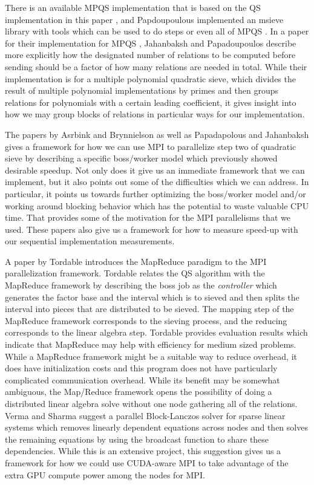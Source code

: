 \documentclass[11pt,twocolumn]{article}
\begin{document}
\indent There is an available MPQS implementation that is based on the QS implementation in this paper \cite{bytopia:help}, and Papdoupoulous implemented an msieve library with tools which can be used to do steps or even all of MPQS \cite{papadopoulos:msieve}. In a paper for their implementation for MPQS \cite{jahenbaksh:mpiQS}, Jahanbaksh and Papadoupoulos describe more explicitly how the designated number of relations to be computed before sending should be a factor of how many relations are needed in total. While their implementation is for a multiple polynomial quadratic sieve, which divides the result of multiple polynomial implementations by primes and then groups relations for polynomials with a certain leading coefficient, it gives insight into how we may group blocks of relations in particular ways for our implementation.

\indent The papers by Asrbink and Brynnielson \cite{asbrink:parallelqs} as well as Papadapolous and Jahanbaksh \cite{jahenbaksh:mpiQS} gives a framework for how we can use MPI to parallelize step two of quadratic sieve by describing a specific boss/worker model which previously showed desirable speedup. Not only does it give us an immediate framework that we can implement, but it also points out some of the difficulties which we can address. In particular, it points  us towards further optimizing the boss/worker model and/or working around blocking behavior which has the potential to waste valuable CPU time. That provides some of the motivation for the MPI parallelisms that we used. These papers also give us a framework for how to measure speed-up with our sequential implementation measurements.

\indent A paper by Tordable  \cite{tordable:intmapreduce} introduces the MapReduce paradigm to the MPI parallelization framework. Tordable relates the QS algorithm with the MapReduce framework by describing the boss job as the \textit{controller} which generates the factor base and the interval which is to sieved and then splits the interval into pieces that are distributed to be sieved. The mapping step of the MapReduce framework corresponds to the sieving process, and the reducing corresponds to the linear algebra step. Tordable provides evaluation results which indicate that MapReduce may help with efficiency for medium sized problems. While a MapReduce framework might be a suitable way to reduce overhead, it does have initialization costs and this program does not have particularly complicated communication overhead. While its benefit may be somewhat ambiguous, the Map/Reduce framework opens the possibility of doing a distributed linear algebra solve without one node gathering all of the relations. Verma and Sharma \cite{verma:cudampilanczos} suggest a parallel Block-Lanczos solver for sparse linear systems which removes linearly dependent equations across nodes and then solves the remaining equations by using the broadcast function to share these dependencies. While this is an extensive project, this suggestion gives us a framework for how we could use CUDA-aware MPI to take advantage of the extra GPU compute power among the nodes for MPI.
\end{document}

